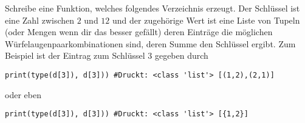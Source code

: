 \begin{aufg}
  Schreibe eine Funktion, welches folgendes Verzeichnis  erzeugt.
  Der Schlüssel ist eine Zahl zwischen $2$ und $12$ und der zugehörige
  Wert ist eine Liste von Tupeln (oder Mengen wenn dir das besser gefällt) deren Einträge die möglichen Würfelaugenpaarkombinationen sind,
  deren Summe den Schlüssel ergibt.
  Zum Beispiel ist der Eintrag zum Schlüssel $3$ gegeben durch
  \begin{lstlisting}
print(type(d[3]), d[3])) #Druckt: <class 'list'> [(1,2),(2,1)]
  \end{lstlisting}
  oder eben
  \begin{lstlisting}
print(type(d[3]), d[3])) #Druckt: <class 'list'> [{1,2}]
  \end{lstlisting}
\end{aufg}
